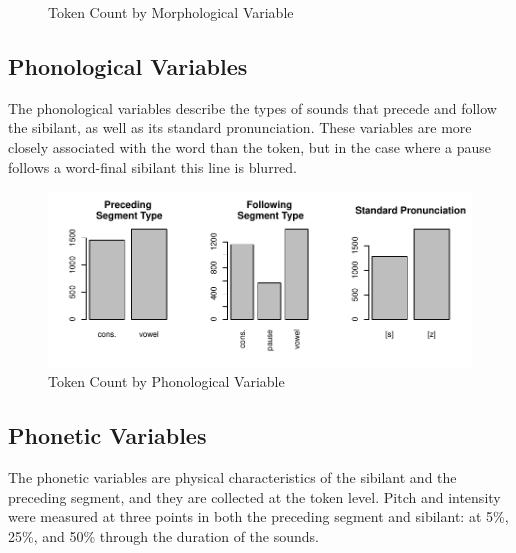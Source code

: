 \documentclass[a4paper]{article}
\begin{document}
\begin{figure}[ht]
\begin{center}
\begin{minipage}[t]{0.3\linewidth}
\begin{center}
      \end{center}\end{minipage}
      \vspace{-5pt}
      \caption{Token Count by Morphological Variable}
      \label{fig:morpho}
    \end{center}
\end{figure}

\vspace{-20pt}
\subsection*{Phonological Variables}
The phonological variables describe the types of sounds that
precede and follow the sibilant, as well as its standard
pronunciation.  These variables are more closely associated with the word
than the token, but in the case where a pause follows a word-final
sibilant this line is blurred.\vspace{-5pt}


\begin{figure}[ht]
  \begin{center}
    \begin{minipage}[t]{0.8\linewidth}
      \begin{center}
\includegraphics{prelim-015}
      \end{center}
    \end{minipage}
    \caption{Token Count by Phonological Variable}
    \label{fig:phono}
  \end{center}
\end{figure}
\subsection*{Phonetic Variables}
The phonetic variables are physical characteristics of the
sibilant and the preceding segment, and they are collected at the
token level.  Pitch and intensity were measured
at three points in both the preceding segment and sibilant: at 5\%,
25\%, and 50\% through the duration of the sounds.\vspace{-15pt}
\end{document}
